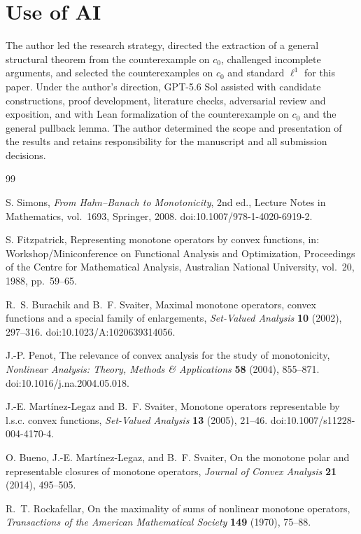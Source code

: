 \section*{Use of AI}
The author led the research strategy, directed the extraction of a general
structural theorem from the counterexample on $c_0$, challenged incomplete
arguments, and selected the counterexamples on $c_0$ and standard $\ell^1$
for this paper. Under the author's direction, GPT-5.6 Sol assisted with
candidate constructions, proof development, literature checks, adversarial
review and exposition, and with Lean formalization of the counterexample
on $c_0$ and the general pullback lemma. The author determined the scope
and presentation of the results and retains responsibility for the
manuscript and all submission decisions.

\begin{thebibliography}{99}
\raggedright
{}
S. Simons,
\emph{From Hahn--Banach to Monotonicity}, 2nd ed.,
Lecture Notes in Mathematics, vol.~1693, Springer, 2008.
doi:10.1007/978-1-4020-6919-2.

S. Fitzpatrick,
Representing monotone operators by convex functions,
in: Workshop/Miniconference on Functional Analysis and Optimization,
Proceedings of the Centre for Mathematical Analysis, Australian National
University, vol.~20, 1988, pp.~59--65.

R.~S. Burachik and B.~F. Svaiter,
Maximal monotone operators, convex functions and a special family of enlargements,
\emph{Set-Valued Analysis} \textbf{10} (2002), 297--316.
doi:10.1023/A:1020639314056.

J.-P. Penot,
The relevance of convex analysis for the study of monotonicity,
\emph{Nonlinear Analysis: Theory, Methods \& Applications}
\textbf{58} (2004), 855--871.
doi:10.1016/j.na.2004.05.018.

J.-E. Mart\'{i}nez-Legaz and B.~F. Svaiter,
Monotone operators representable by l.s.c. convex functions,
\emph{Set-Valued Analysis} \textbf{13} (2005), 21--46.
doi:10.1007/s11228-004-4170-4.

O. Bueno, J.-E. Mart\'{i}nez-Legaz, and B.~F. Svaiter,
On the monotone polar and representable closures of monotone operators,
\emph{Journal of Convex Analysis} \textbf{21} (2014), 495--505.

R.~T. Rockafellar,
On the maximality of sums of nonlinear monotone operators,
\emph{Transactions of the American Mathematical Society}
\textbf{149} (1970), 75--88.


\end{thebibliography}
